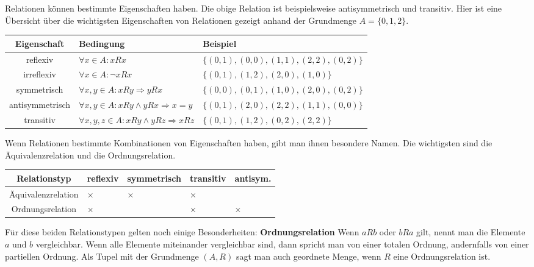 \documentclass[12pt]{article}
\begin{document}
			\noindent Relationen können bestimmte Eigenschaften haben. Die obige Relation ist beispielsweise antisymmetrisch und transitiv. Hier ist eine Übersicht über die wichtigsten Eigenschaften von Relationen gezeigt anhand der Grundmenge $A=\{0,1,2\}$.
			\begin{center}
				\bgroup
				\def\arraystretch{1.5}
				\begin{tabularx}{\linewidth}{|c|Y|Y|}
					\hline
					\textbf{Eigenschaft} & \textbf{Bedingung} & \textbf{Beispiel}  \\\hline
					reflexiv & $\forall x\in A:xRx$ & $\{(0,1),(0,0),(1,1),(2,2),(0,2)\}$  \\\hline
					irreflexiv & $\forall x\in A:\lnot xRx$ & $\{(0,1),(1,2),(2,0),(1,0)\}$  \\\hline
					symmetrisch & $\forall x,y\in A:xRy\Rightarrow yRx$ & $\{(0,0),(0,1),(1,0),(2,0),(0,2)\}$  \\\hline
					antisymmetrisch & $\forall x,y\in A:xRy\land yRx\Rightarrow x=y$ & $\{(0,1),(2,0),(2,2),(1,1),(0,0)\}$  \\\hline
					transitiv & $\forall x,y,z\in A:xRy\land yRz\Rightarrow xRz$ & $\{(0,1),(1,2),(0,2),(2,2)\}$  \\\hline
				\end{tabularx}
				\egroup
			\end{center}
			Wenn Relationen bestimmte Kombinationen von Eigenschaften haben, gibt man ihnen besondere Namen. Die wichtigsten sind die Äquivalenzrelation und die Ordnungsrelation.
			\begin{center}
				\bgroup
				\def\arraystretch{1.5}
				\begin{tabularx}{\linewidth}{|c|Y|Y|Y|Y|}
					\hline
					\textbf{Relationstyp} & \textbf{reflexiv} & \textbf{symmetrisch} & \textbf{transitiv} & \textbf{antisym.} \\\hline
					Äquivalenzrelation & $\times$ & $\times$ & $\times$ &    \\\hline
					Ordnungsrelation & $\times$ &  & $\times$ & $\times$   \\\hline
				\end{tabularx}
				\egroup
			\end{center}
			Für diese beiden Relationstypen gelten noch einige Besonderheiten:\newline\newline
			\textbf{Ordnungsrelation}\newline
			Wenn $aRb$ oder $bRa$ gilt, nennt man die Elemente $a$ und $b$ vergleichbar. Wenn alle Elemente miteinander vergleichbar sind, dann spricht man von einer totalen Ordnung, andernfalls von einer partiellen Ordnung. Als Tupel mit der Grundmenge $(A,R)$ sagt man auch geordnete Menge, wenn $R$ eine Ordnungsrelation ist.\newline\newline
\end{document}
